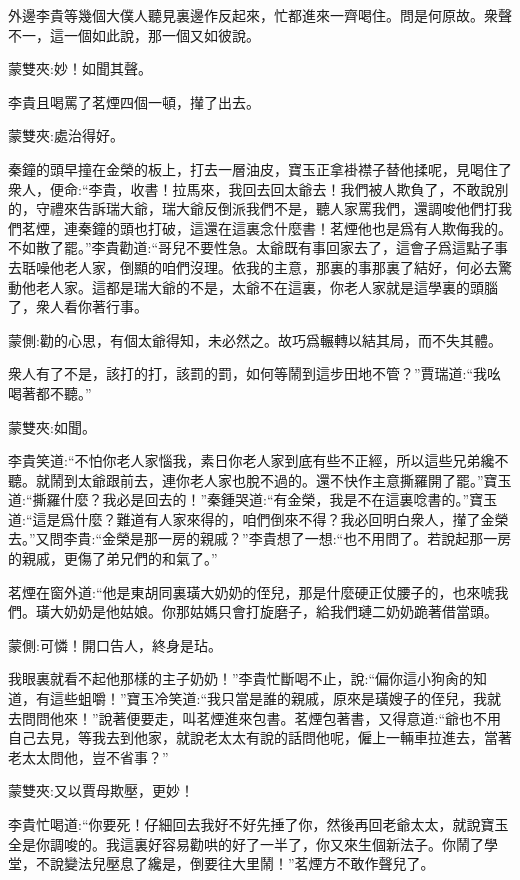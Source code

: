 \begin{parag}
    外邊李貴等幾個大僕人聽見裏邊作反起來，忙都進來一齊喝住。問是何原故。衆聲不一，這一個如此說，那一個又如彼說。\begin{note}蒙雙夾:妙！如聞其聲。\end{note}李貴且喝罵了茗煙四個一頓，攆了出去。\begin{note}蒙雙夾:處治得好。\end{note}秦鐘的頭早撞在金榮的板上，打去一層油皮，寶玉正拿褂襟子替他揉呢，見喝住了衆人，便命:“李貴，收書！拉馬來，我回去回太爺去！我們被人欺負了，不敢說別的，守禮來告訴瑞大爺，瑞大爺反倒派我們不是，聽人家罵我們，還調唆他們打我們茗煙，連秦鐘的頭也打破，這還在這裏念什麼書！茗煙他也是爲有人欺侮我的。不如散了罷。”李貴勸道:“哥兒不要性急。太爺既有事回家去了，這會子爲這點子事去聒噪他老人家，倒顯的咱們沒理。依我的主意，那裏的事那裏了結好，何必去驚動他老人家。這都是瑞大爺的不是，太爺不在這裏，你老人家就是這學裏的頭腦了，衆人看你著行事。\begin{note}蒙側:勸的心思，有個太爺得知，未必然之。故巧爲輾轉以結其局，而不失其體。\end{note}衆人有了不是，該打的打，該罰的罰，如何等鬧到這步田地不管？”賈瑞道:“我吆喝著都不聽。”\begin{note}蒙雙夾:如聞。\end{note}李貴笑道:“不怕你老人家惱我，素日你老人家到底有些不正經，所以這些兄弟纔不聽。就鬧到太爺跟前去，連你老人家也脫不過的。還不快作主意撕羅開了罷。”寶玉道:“撕羅什麼？我必是回去的！”秦鍾哭道:“有金榮，我是不在這裏唸書的。”寶玉道:“這是爲什麼？難道有人家來得的，咱們倒來不得？我必回明白衆人，攆了金榮去。”又問李貴:“金榮是那一房的親戚？”李貴想了一想:“也不用問了。若說起那一房的親戚，更傷了弟兄們的和氣了。”
\end{parag}


\begin{parag}
    茗煙在窗外道:“他是東胡同裏璜大奶奶的侄兒，那是什麼硬正仗腰子的，也來唬我們。璜大奶奶是他姑娘。你那姑媽只會打旋磨子，給我們璉二奶奶跪著借當頭。\begin{note}蒙側:可憐！開口告人，終身是玷。\end{note}我眼裏就看不起他那樣的主子奶奶！”李貴忙斷喝不止，說:“偏你這小狗肏的知道，有這些蛆嚼！”寶玉冷笑道:“我只當是誰的親戚，原來是璜嫂子的侄兒，我就去問問他來！”說著便要走，叫茗煙進來包書。茗煙包著書，又得意道:“爺也不用自己去見，等我去到他家，就說老太太有說的話問他呢，僱上一輛車拉進去，當著老太太問他，豈不省事？”\begin{note}蒙雙夾:又以賈母欺壓，更妙！\end{note}李貴忙喝道:“你要死！仔細回去我好不好先捶了你，然後再回老爺太太，就說寶玉全是你調唆的。我這裏好容易勸哄的好了一半了，你又來生個新法子。你鬧了學堂，不說變法兒壓息了纔是，倒要往大里鬧！”茗煙方不敢作聲兒了。
\end{parag}


